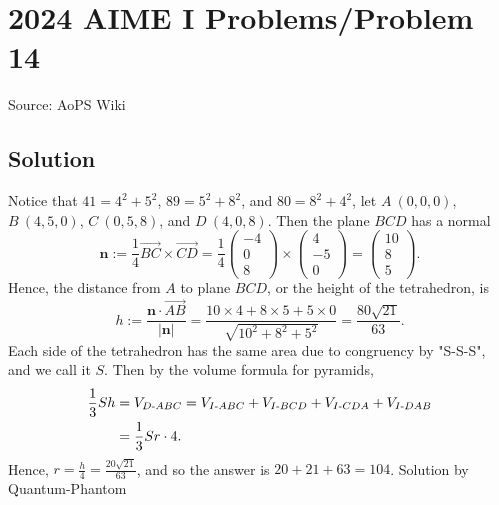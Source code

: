 \documentclass[12pt]{article}
\begin{document}
\section*{{2024 AIME I Problems/Problem 14}}
Source: AoPS Wiki

\subsection*{Solution}
Notice that \(41=4^2+5^2\), \(89=5^2+8^2\), and \(80=8^2+4^2\), let \(A~(0,0,0)\), \(B~(4,5,0)\), \(C~(0,5,8)\), and \(D~(4,0,8)\). Then the plane \(BCD\) has a normal
\begin{equation*}
\mathbf n:=\frac14\overrightarrow{BC}\times\overrightarrow{CD}=\frac14\begin{pmatrix}-4\\0\\8\end{pmatrix}\times\begin{pmatrix}4\\-5\\0\end{pmatrix}=\begin{pmatrix}10\\8\\5\end{pmatrix}.
\end{equation*}
Hence, the distance from \(A\) to plane \(BCD\), or the height of the tetrahedron, is
\begin{equation*}
h:=\frac{\mathbf n\cdot\overrightarrow{AB}}{|\mathbf n|}=\frac{10\times4+8\times5+5\times0}{\sqrt{10^2+8^2+5^2}}=\frac{80\sqrt{21}}{63}.
\end{equation*}
Each side of the tetrahedron has the same area due to congruency by "S-S-S", and we call it \(S\). Then by the volume formula for pyramids,
\begin{align*}
\frac13Sh&=V_{D\text-ABC}=V_{I\text-ABC}+V_{I\text-BCD}+V_{I\text-CDA}+V_{I\text-DAB}\\
&=\frac13Sr\cdot4.
\end{align*}
Hence, \(r=\tfrac h4=\tfrac{20\sqrt{21}}{63}\), and so the answer is \(20+21+63=\boxed{104}\). Solution by Quantum-Phantom
\end{document}
